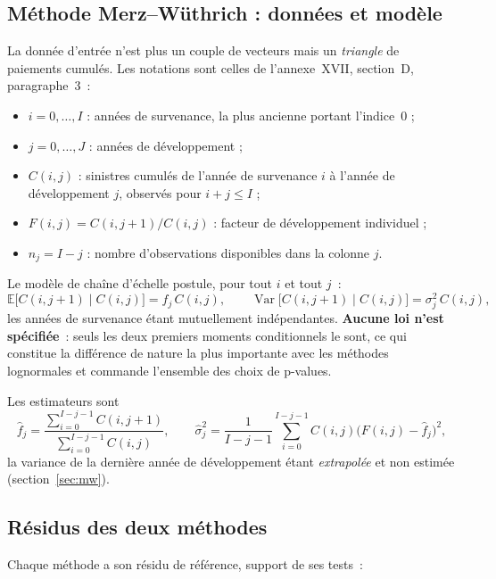 \documentclass[a4paper,11pt]{article}
\begin{document}
\subsection*{Méthode Merz--Wüthrich : données et modèle}
\label{sec:notations-mw}

La donnée d'entrée n'est plus un couple de vecteurs mais un \emph{triangle} de
paiements cumulés. Les notations sont celles de l'annexe~XVII, section~D,
paragraphe~3~:

\begin{itemize}[itemsep=1pt]
  \item $i = 0,\dots,I$ : années de survenance, la plus ancienne portant
        l'indice~0 ;
  \item $j = 0,\dots,J$ : années de développement ;
  \item $C(i,j)$ : sinistres cumulés de l'année de survenance $i$ à l'année de
        développement $j$, observés pour $i + j \le I$ ;
  \item $F(i,j) = C(i,j+1)/C(i,j)$ : facteur de développement individuel ;
  \item $n_j = I - j$ : nombre d'observations disponibles dans la colonne $j$.
\end{itemize}

\noindent
Le modèle de chaîne d'échelle postule, pour tout $i$ et tout $j$~:
\[
  \mathbb{E}\big[C(i,j+1)\mid C(i,j)\big] = f_j\,C(i,j),
  \qquad
  \operatorname{Var}\big[C(i,j+1)\mid C(i,j)\big] = \sigma_j^2\,C(i,j),
\]
les années de survenance étant mutuellement indépendantes. \textbf{Aucune loi
n'est spécifiée}~: seuls les deux premiers moments conditionnels le sont, ce qui
constitue la différence de nature la plus importante avec les méthodes
lognormales et commande l'ensemble des choix de p-values.

Les estimateurs sont
\[
  \hat f_j = \frac{\sum_{i=0}^{I-j-1} C(i,j+1)}{\sum_{i=0}^{I-j-1} C(i,j)},
  \qquad
  \hat\sigma_j^2 = \frac{1}{I-j-1}\sum_{i=0}^{I-j-1} C(i,j)
  \big(F(i,j) - \hat f_j\big)^2 ,
\]
la variance de la dernière année de développement étant \emph{extrapolée} et non
estimée (section~\ref{sec:mw}).

\subsection*{Résidus des deux méthodes}

Chaque méthode a son résidu de référence, support de ses tests~:
\end{document}
